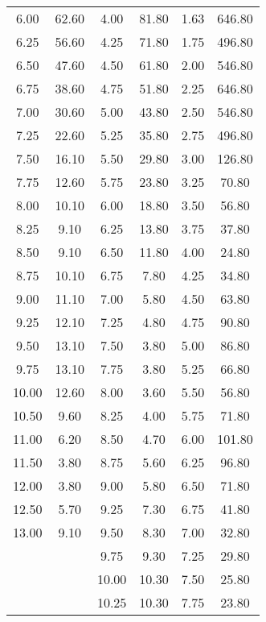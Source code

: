 \begin{longtable}{S[table-format=3.2] S[table-format=3.2] S[table-format=3.2] S[table-format=3.2] S[table-format=3.2] S[table-format=3.2]}
                6.00 & 62.60 & 4.00 & 81.80 & 1.63 & 646.80\\
                6.25 & 56.60 & 4.25 & 71.80 & 1.75 & 496.80\\
                6.50 & 47.60 & 4.50 & 61.80 & 2.00 & 546.80\\
                6.75 & 38.60 & 4.75 & 51.80 & 2.25 & 646.80\\
                7.00 & 30.60 & 5.00 & 43.80 & 2.50 & 546.80\\
                7.25 & 22.60 & 5.25 & 35.80 & 2.75 & 496.80\\
                7.50 & 16.10 & 5.50 & 29.80 & 3.00 & 126.80\\
                7.75 & 12.60 & 5.75 & 23.80 & 3.25 & 70.80\\
                8.00 & 10.10 & 6.00 & 18.80 & 3.50 & 56.80\\
                8.25 & 9.10 & 6.25 & 13.80 & 3.75 & 37.80\\
                8.50 & 9.10 & 6.50 & 11.80 & 4.00 & 24.80\\
                8.75 & 10.10 & 6.75 & 7.80 & 4.25 & 34.80\\
                9.00 & 11.10 & 7.00 & 5.80 & 4.50 & 63.80\\
                9.25 & 12.10 & 7.25 & 4.80 & 4.75 & 90.80\\
                9.50 & 13.10 & 7.50 & 3.80 & 5.00 & 86.80\\
                9.75 & 13.10 & 7.75 & 3.80 & 5.25 & 66.80\\
                10.00 & 12.60 & 8.00 & 3.60 & 5.50 & 56.80\\
                10.50 & 9.60 & 8.25 & 4.00 & 5.75 & 71.80\\
                11.00 & 6.20 & 8.50 & 4.70 & 6.00 & 101.80\\
                11.50 & 3.80 & 8.75 & 5.60 & 6.25 & 96.80\\
                12.00 & 3.80 & 9.00 & 5.80 & 6.50 & 71.80\\
                12.50 & 5.70 & 9.25 & 7.30 & 6.75 & 41.80\\
                13.00 & 9.10 & 9.50 & 8.30 & 7.00 & 32.80\\
                     &     & 9.75 & 9.30 & 7.25 & 29.80\\
                     &     & 10.00 & 10.30 & 7.50 & 25.80\\
                     &     & 10.25 & 10.30 & 7.75 & 23.80\\

\end{longtable}

